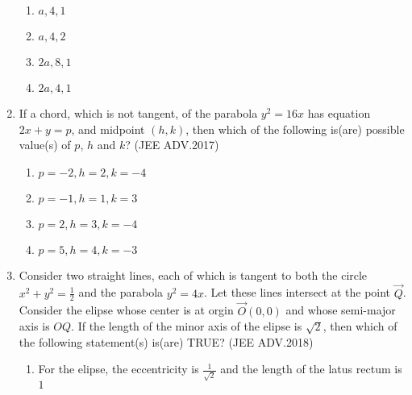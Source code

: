 \begin{enumerate}
	       \begin{enumerate}
		      \item $a,4,1$
		      \item $a,4,2$
		      \item $2a,8,1$
		      \item $2a,4,1$
	       \end{enumerate}
      \item If a chord, which is not tangent, of the parabola $y^2=16x$ has equation $2x+y=p$, and midpoint $(h,k)$, then which of the following is(are) possible value(s) of $p$, $h$ and $k$? 
	      \hfill(JEE ADV.2017)
	      
	       \begin{enumerate}
		      \item $p=-2,h=2,k=-4$
		      \item $p=-1,h=1,k=3$
		      \item $p=2,h=3,k=-4$
		      \item $p=5,h=4,k=-3$


	       \end{enumerate}
      \item Consider two straight lines, each of which is tangent to both the circle $x^2+y^2=\frac{1}{2}$
	      and the parabola $y^2=4x$. Let these lines intersect at the point $\vec{Q}$. Consider the elipse whose center is at orgin $\vec{O}(0,0)$ and whose semi-major axis is $OQ$.
	      If the length of the minor axis of the elipse is $\sqrt{2}$, then which of the following statement(s) is(are) TRUE? 
	      \hfill(JEE ADV.2018)
	      
	       \begin{enumerate}
		      \item For the elipse, the eccentricity is $\frac{1}{\sqrt{2}}$ and the length of the latus rectum is $1$


\end{enumerate}
\end{enumerate}
